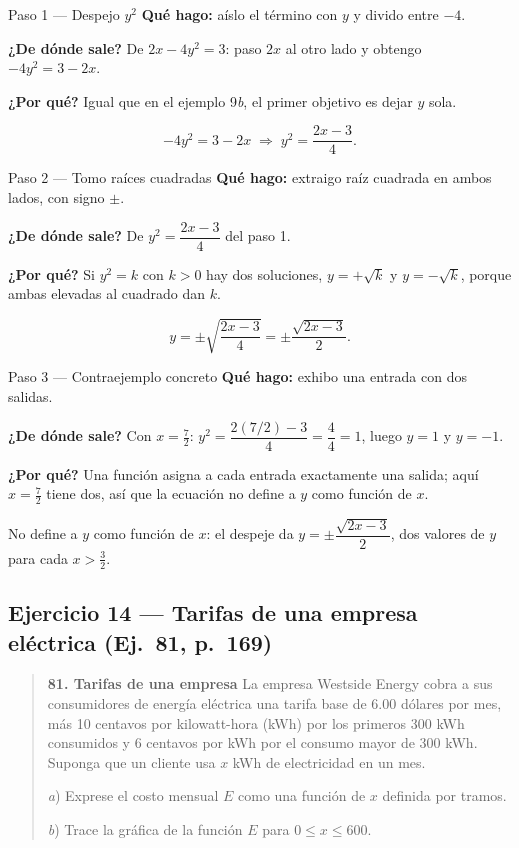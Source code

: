 \documentclass[11pt]{article}
\begin{document}
\begin{paso}{Paso 1 --- Despejo $y^2$}
\textbf{Qué hago:} aíslo el término con $y$ y divido entre $-4$.

\textbf{¿De dónde sale?} De $2x-4y^2=3$: paso $2x$ al otro lado y obtengo $-4y^2=3-2x$.

\textbf{¿Por qué?} Igual que en el ejemplo 9\textit{b}, el primer objetivo es dejar $y$ sola.

\[
-4y^2=3-2x \;\Longrightarrow\; y^2=\frac{2x-3}{4}.
\]
\end{paso}

\begin{paso}{Paso 2 --- Tomo raíces cuadradas}
\textbf{Qué hago:} extraigo raíz cuadrada en ambos lados, con signo $\pm$.

\textbf{¿De dónde sale?} De $y^2=\dfrac{2x-3}{4}$ del paso 1.

\textbf{¿Por qué?} Si $y^2=k$ con $k>0$ hay dos soluciones, $y=+\sqrt{k}$ y $y=-\sqrt{k}$, porque ambas elevadas al cuadrado dan $k$.

\[
y=\pm\sqrt{\frac{2x-3}{4}}=\pm\frac{\sqrt{2x-3}}{2}.
\]
\end{paso}

\begin{paso}{Paso 3 --- Contraejemplo concreto}
\textbf{Qué hago:} exhibo una entrada con dos salidas.

\textbf{¿De dónde sale?} Con $x=\tfrac72$: $y^2=\dfrac{2(7/2)-3}{4}=\dfrac{4}{4}=1$, luego $y=1$ y $y=-1$.

\textbf{¿Por qué?} Una función asigna a cada entrada exactamente una salida; aquí $x=\tfrac72$ tiene dos, así que la ecuación no define a $y$ como función de $x$.
\end{paso}

\begin{resp}
No define a $y$ como función de $x$: el despeje da $y=\pm\dfrac{\sqrt{2x-3}}{2}$, dos valores de $y$ para cada $x>\tfrac32$.
\end{resp}

\subsection*{Ejercicio 14 — Tarifas de una empresa eléctrica (Ej.~81, p.~169)}

\begin{quote}
\textbf{81. Tarifas de una empresa} \quad La empresa Westside Energy cobra a sus consumidores de energía eléctrica una tarifa base de 6.00 dólares por mes, más 10 centavos por kilowatt-hora (kWh) por los primeros 300 kWh consumidos y 6 centavos por kWh por el consumo mayor de 300 kWh. Suponga que un cliente usa $x$ kWh de electricidad en un mes.

\quad \textit{a}) Exprese el costo mensual $E$ como una función de $x$ definida por tramos.

\quad \textit{b}) Trace la gráfica de la función $E$ para $0\le x\le 600$.
\end{quote}
\end{document}
